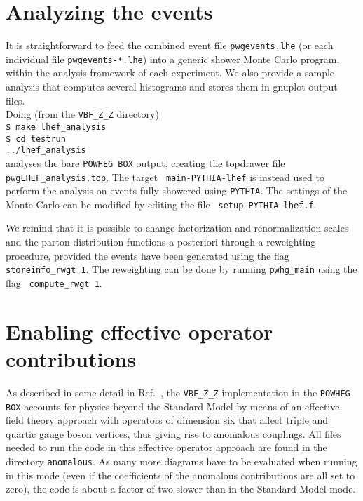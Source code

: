 \documentclass[a4paper,11pt]{article}
\newcommand\POWHEGBOX{{\tt POWHEG BOX}}
\begin{document}
\section*{Analyzing the events}
%
It is straightforward to feed the combined event file {\tt pwgevents.lhe} (or each individual file {\tt pwgevents-*.lhe}) into a generic
shower Monte Carlo program, within the analysis framework of each
experiment. We also provide a sample analysis that computes several
histograms and stores them in gnuplot output files.
\\[2ex]
Doing (from the {\tt VBF\_Z\_Z} directory)
\\[2ex]
{\tt \$ make lhef\_analysis}
\\[2ex]
{\tt \$ cd testrun}
\\[2ex]
{\tt ../lhef\_analysis}
\\[2ex]
analyses the bare {\tt POWHEG BOX} output, creating the topdrawer file
{\tt pwgLHEF\_analysis.top}. The target {\tt
  main-PYTHIA-lhef} is instead used to perform the analysis on events
fully showered using  {\tt PYTHIA}. The settings of
the Monte Carlo can be modified by editing the file {\tt
  setup-PYTHIA-lhef.f}. 

We remind that it is possible to change factorization and
renormalization scales and the parton distribution functions a
posteriori through a reweighting procedure, provided the events have
been generated using the flag {\tt storeinfo\_rwgt 1}. The reweighting
can be done by running {\tt pwhg\_main} using the flag {\tt
  compute\_rwgt 1}.


\section*{Enabling effective operator contributions}
%
As described in some detail in Ref.~\cite{JKZ}, the {\tt VBF\_Z\_Z} implementation in the \POWHEGBOX{} accounts for physics beyond the Standard Model by means of an effective field theory approach with operators of dimension six that affect triple and quartic gauge boson vertices, thus giving rise to anomalous couplings.  
%
All files needed to run the code in this effective operator approach 
are found in the directory {\tt anomalous}. As many more diagrams have
to be evaluated when running in this mode (even if the coefficients of the anomalous contributions are all set to zero), the code is about a factor of two slower than in the Standard Model mode.  
\end{document}
